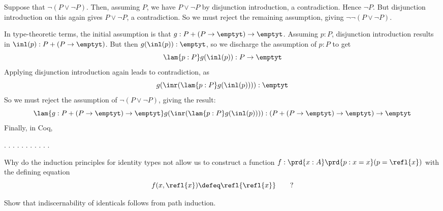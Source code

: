 \soln  
Suppose that $\lnot(P \lor \lnot P)$.  Then, assuming $P$, we have
$P \lor \lnot P$ by disjunction introduction, a contradiction.  Hence
$\lnot P$.  But disjunction introduction on this again gives $P \lor \lnot P$,
a contradiction.  So we must reject the remaining assumption, giving
$\lnot\lnot(P \lor \lnot P)$.


In type-theoretic terms, the initial assumption is that $g : P + (P \to
\emptyt) \to \emptyt$.  Assuming $p : P$, disjunction introduction results in
$\inl(p) : P + (P \to \emptyt)$.  But then $g(\inl(p)) : \emptyt$, so we
discharge the assumption of $p : P$ to get
\[
  \lam{p:P}g(\inl(p)) : P \to \emptyt
\]
Applying disjunction introduction again leads to contradiction, as
\[
  g(\inr(\lam{p:P}g(\inl(p)))) : \emptyt
\]
So we must reject the assumption of $\lnot( P \lor \lnot P)$, giving the
result:
\[
  \lam{g:P + (P \to \emptyt) \to \emptyt}g(\inr(\lam{p:P}g(\inl(p)))) 
  : 
  (P + (P \to \emptyt) \to \emptyt) \to \emptyt
\]
Finally, in Coq, \begin{coqdoccode}
\coqdocemptyline
\coqdocnoindent
{} \coqdocnotation{\ensuremath{\lnot}} \coqdocnotation{\ensuremath{\lnot}} \coqdocnotation{(}  \coqdocnotation{\ensuremath{\lnot}}\coqdocnotation{)}.\coqdoceol
\coqdocemptyline
\coqdocnoindent
{}.\coqdoceol
\coqdocemptyline
\coqdocnoindent
{} .\coqdoceol
\coqdocemptyline
\coqdocnoindent
{} .\coqdoceol
\coqdocemptyline
\coqdocnoindent
{} .\coqdoceol
\coqdocemptyline
\coqdocnoindent
{}.\coqdoceol
\coqdocemptyline
\coqdocnoindent
{} .\coqdoceol
\coqdocemptyline
\coqdocnoindent
{} .\coqdoceol
\coqdocemptyline
\coqdocnoindent
{}.\coqdoceol
\coqdocemptyline
\coqdocnoindent
{} .\coqdoceol
\coqdocemptyline
\coqdocnoindent
{}.\coqdoceol
\coqdocemptyline
\coqdocemptyline
\end{coqdoccode}


Why do the induction principles for identity types not allow
us to construct a function $f : \prd{x:A}\prd{p:x=x}(p = \refl{x})$ with the
defining equation
\[
  f(x, \refl{x}) \defeq \refl{\refl{x}}\qquad?
\]


Show that indiscernability of identicals follows from path
induction.
\begin{coqdoccode}
\end{coqdoccode}
